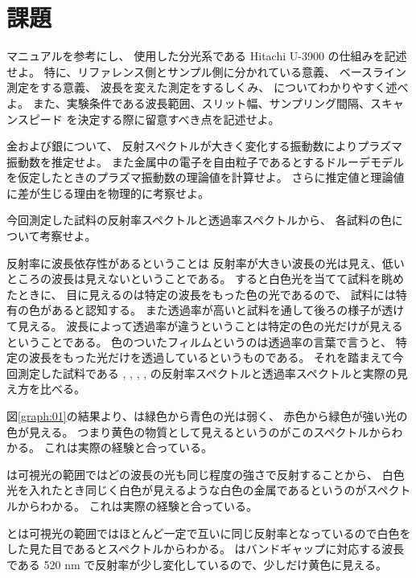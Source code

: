 \documentclass[11pt,dvipdfmx,a4paper]{jsarticle}
\begin{document}
\section{課題}
\begin{tcolorbox}[title = 課題1]
    マニュアルを参考にし、
    使用した分光系である Hitachi U-3900 の仕組みを記述せよ。
    特に、リファレンス側とサンプル側に分かれている意義、
    ベースライン測定をする意義、
    波長を変えた測定をするしくみ、
    についてわかりやすく述べよ。
    また、実験条件である波長範囲、スリット幅、サンプリング間隔、スキャンスピード
    を決定する際に留意すべき点を記述せよ。
\end{tcolorbox}

\begin{tcolorbox}[title = 課題2]
    金および銀について、
    反射スペクトルが大きく変化する振動数によりプラズマ振動数を推定せよ。
    また金属中の電子を自由粒子であるとするドルーデモデルを仮定したときのプラズマ振動数の理論値を計算せよ。
    さらに推定値と理論値に差が生じる理由を物理的に考察せよ。
\end{tcolorbox}

\begin{tcolorbox}[title = 課題3]
    今回測定した試料の反射率スペクトルと透過率スペクトルから、
    各試料の色について考察せよ。
\end{tcolorbox}

反射率に波長依存性があるということは
反射率が大きい波長の光は見え、低いところの波長は見えないということである。
すると白色光を当てて試料を眺めたときに、
目に見えるのは特定の波長をもった色の光であるので、
試料には特有の色があると認知する。
また透過率が高いと試料を通して後ろの様子が透けて見える。
波長によって透過率が違うということは特定の色の光だけが見えるということである。
色のついたフィルムというのは透過率の言葉で言うと、
特定の波長をもった光だけを透過しているというものである。
それを踏まえて今回測定した試料である , , , , 
の反射率スペクトルと透過率スペクトルと実際の見え方を比べる。

図\ref{graph:01}の結果より、は緑色から青色の光は弱く、
赤色から緑色が強い光の色が見える。
つまり黄色の物質として見えるというのがこのスペクトルからわかる。
これは実際の経験と合っている。

は可視光の範囲ではどの波長の光も同じ程度の強さで反射することから、
白色光を入れたとき同じく白色が見えるような白色の金属であるというのがスペクトルからわかる。
これは実際の経験と合っている。

とは可視光の範囲ではほとんど一定で互いに同じ反射率となっているので白色をした見た目であるとスペクトルからわかる。
 はバンドギャップに対応する波長である 520 nm で反射率が少し変化しているので、少しだけ黄色に見える。
\end{document}
